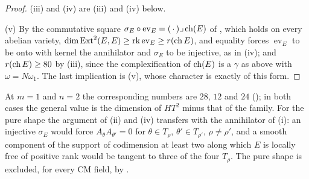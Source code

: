 \begin{proof}
(iii) and (iv) are (iii) and (iv) below.

(v) By the commutative square $\sigma_{E}\circ\operatorname{ev}_{E}=(\,\cdot\,)
\lrcorner\operatorname{ch}(E)$ of , which holds on every abelian
variety, $\dim\operatorname{Ext}^{2}(E,E)\ge\operatorname{rk}\operatorname{ev}_{E}\ge
r(\operatorname{ch} E)$, and equality forces $\operatorname{ev}_{E}$ to be onto with kernel
the annihilator and $\sigma_{E}$ to be injective, as in
(iv); and $r(\operatorname{ch} E)\ge80$ by (iii), since the
complexification of $\operatorname{ch}(E)$ is a $\gamma$ as above with $\omega=N\omega_{1}$.
The last implication is (v), whose character is
exactly of this form.
\end{proof}

At $m=1$ and $n=2$ the corresponding numbers are $28$, $12$ and $24$
(); in both cases the general value is the dimension
of $HT^{2}$ minus that of the family. For the pure shape the argument of
(ii) and (iv) transfers with the annihilator of
(i): an injective $\sigma_{E}$ would force
$A_{\theta}A_{\theta'}=0$ for $\theta\in T_{\rho}$, $\theta'\in T_{\rho'}$,
$\rho\ne\rho'$, and a smooth component of the support of codimension at least
two along which $E$ is locally free of positive rank would be tangent to three
of the four $T_{\rho}$. The pure shape is excluded, for every CM
field, by .

